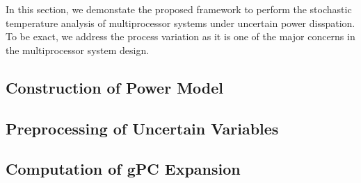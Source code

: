 In this section, we demonstate the proposed framework to perform the stochastic temperature analysis of multiprocessor systems under uncertain power disspation. To be exact, we address the process variation as it is one of the major concerns in the multiprocessor system design.

\subsection{Construction of Power Model} 


\subsection{Preprocessing of Uncertain Variables} 


\subsection{Computation of gPC Expansion} 

